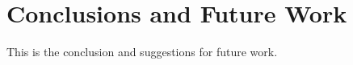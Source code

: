 \chapter{Conclusions and Future Work}
\label{section: Conclusion}

This is the conclusion and suggestions for future work.